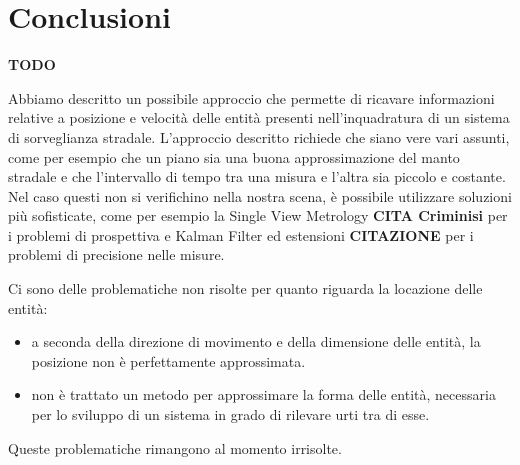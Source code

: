 \chapter{Conclusioni}
\label{sec:conclusioni}

\textbf{TODO}

Abbiamo descritto un possibile approccio che permette di ricavare informazioni relative a posizione e velocità delle entità presenti nell'inquadratura di un sistema di sorveglianza stradale.
L'approccio descritto richiede che siano vere vari assunti, come per esempio che un piano sia una buona approssimazione del manto stradale e che l'intervallo di tempo tra una misura e l'altra sia piccolo e costante.
Nel caso questi non si verifichino nella nostra scena, è possibile utilizzare soluzioni più sofisticate, come per esempio la Single View Metrology \textbf{CITA Criminisi} per i problemi di prospettiva e Kalman Filter ed estensioni \textbf{CITAZIONE} per i problemi di precisione nelle misure.

Ci sono delle problematiche non risolte per quanto riguarda la locazione delle entità:
\begin{itemize}
    \item a seconda della direzione di movimento e della dimensione delle entità, la posizione non è perfettamente approssimata.
    \item non è trattato un metodo per approssimare la forma delle entità, necessaria per lo sviluppo di un sistema in grado di rilevare urti tra di esse.
\end{itemize}
Queste problematiche rimangono al momento irrisolte.
